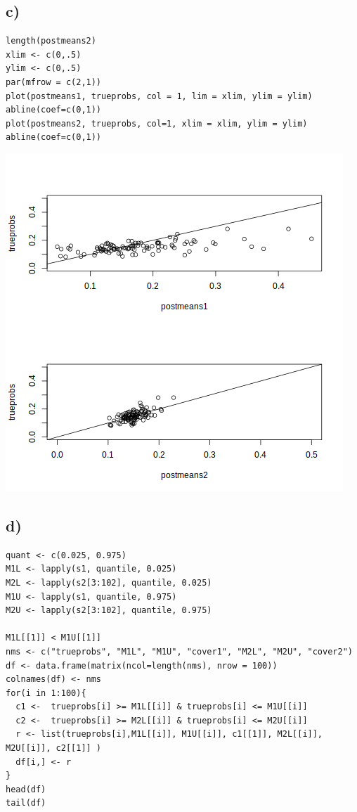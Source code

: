 \documentclass[11pt]{article}
\begin{document}
\subsection*{c)}
\label{sec:org0b31125}

\begin{verbatim}
length(postmeans2)
xlim <- c(0,.5)
ylim <- c(0,.5)
par(mfrow = c(2,1))
plot(postmeans1, trueprobs, col = 1, lim = xlim, ylim = ylim)
abline(coef=c(0,1))
plot(postmeans2, trueprobs, col=1, xlim = xlim, ylim = ylim)
abline(coef=c(0,1))

\end{verbatim}

\begin{center}
\includegraphics[width=.9\linewidth]{fig3.png}
\end{center}

\subsection*{d)}
\label{sec:org8d63748}

\begin{verbatim}
quant <- c(0.025, 0.975)
M1L <- lapply(s1, quantile, 0.025)
M2L <- lapply(s2[3:102], quantile, 0.025)
M1U <- lapply(s1, quantile, 0.975)
M2U <- lapply(s2[3:102], quantile, 0.975)

M1L[[1]] < M1U[[1]]
nms <- c("trueprobs", "M1L", "M1U", "cover1", "M2L", "M2U", "cover2")
df <- data.frame(matrix(ncol=length(nms), nrow = 100))
colnames(df) <- nms
for(i in 1:100){
  c1 <-  trueprobs[i] >= M1L[[i]] & trueprobs[i] <= M1U[[i]]
  c2 <-  trueprobs[i] >= M2L[[i]] & trueprobs[i] <= M2U[[i]]
  r <- list(trueprobs[i],M1L[[i]], M1U[[i]], c1[[1]], M2L[[i]], M2U[[i]], c2[[1]] )
  df[i,] <- r
}
head(df)
tail(df)
\end{verbatim}
\end{document}
